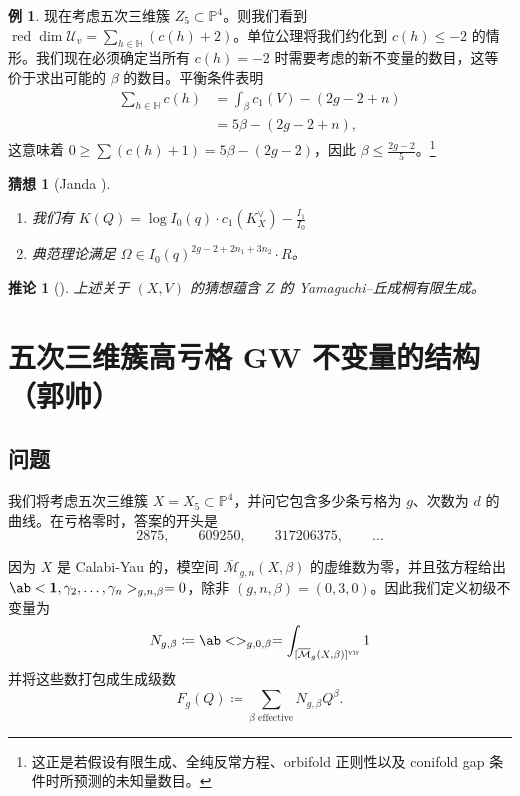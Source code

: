 \documentclass{amsart}
\newtheorem{cor}[thm]{推论}
\newtheorem{conj}[thm]{猜想}
\theoremstyle{definition}
\newtheorem{exm}[thm]{例}
\theoremstyle{remark}
\theoremstyle{plain}
\theoremstyle{definition}
\theoremstyle{remark}
\renewcommand{\H}{\mathbb{H}}
\renewcommand{\P}{\mathbb{P}}
\newcommand{\Mbar}{\overline{\mathcal{M}}}
\newcommand{\mc}[1]{\mathcal{#1}}
\newcommand{\mr}[1]{\mathrm{#1}}
\newcommand{\on}[1]{\operatorname{#1}}
\newcommand{\1}{\mathbf{1}}
\newcommand{\2}{\mathbf{2}}
\newcommand{\3}{\mathbf{3}}
\newcommand{\vir}{\mr{vir}}
\begin{document}
\begin{exm}
    现在考虑五次三维簇 \(Z_5 \subset \P^4\)。则我们看到 \(\on{red}\dim \mc{U}_v = \sum_{h \in \H} (c(h)+2)\)。单位公理将我们约化到 \(c(h) \leq -2\) 的情形。我们现在必须确定当所有 \(c(h) = -2\) 时需要考虑的新不变量的数目，这等价于求出可能的 \(\beta\) 的数目。平衡条件表明
    \begin{align*}
        \sum_{h \in \H} c(h) &= \int_{\beta} c_1(V) - (2g-2+n) \\
        &= 5\beta - (2g-2+n),
    \end{align*}
    这意味着 \(0 \geq \sum (c(h)+1) = 5\beta - (2g-2)\)，因此 \(\beta \leq \frac{2g-2}{5}\)。\footnote{这正是若假设有限生成、全纯反常方程、orbifold 正则性以及 conifold gap 条件时所预测的未知量数目。}
\end{exm}

\begin{conj}[Janda {\cite[Conjecture~1.6]{CJRtropical2025}}]\leavevmode
    \begin{enumerate}
        \item 我们有 \(K(Q) = \log I_0(q) \cdot c_1(K_X^{\vee}) - \frac{I_1}{I_0}\) \\
        \item 典范理论满足 \(\Omega \in I_0(q)^{2g-2+2n_1 + 3 n_2} \cdot R\)。
    \end{enumerate}
\end{conj}

\begin{cor}[{\cite[Theorem~1.7]{CJRtropical2025}}]
    上述关于 \((X, V)\) 的猜想蕴含 \(Z\) 的 Yamaguchi–丘成桐有限生成。
\end{cor}
\section{五次三维簇高亏格 GW 不变量的结构（郭帅）}%
\label{sec:Structure of higher-genus GW invariants of the quintic (Shuai Guo)}

\subsection{问题}%
\label{sub:The problem (Guo)}

我们将考虑五次三维簇 \(X = X_5 \subset \P^4\)，并问它包含多少条亏格为 \(g\)、次数为 \(d\) 的曲线。在亏格零时，答案的开头是
\[ 2875, \qquad 609250, \qquad 317206375, \qquad \ldots \]

因为 \(X\) 是 Calabi-Yau 的，模空间 \(\Mbar_{g,n}(X,\beta)\) 的虚维数为零，并且弦方程给出 \(\ab<\1, \gamma_2, \ldots, \gamma_n>_{g,n,\beta} = 0\)，除非 \((g,n,\beta) = (0,3,0)\)。因此我们定义初级不变量为
\[ N_{g,\beta} \coloneqq \ab<>_{g,0,\beta} = \int_{[\Mbar_g(X,\beta)]^{\vir}} 1 \]
并将这些数打包成生成级数
\[ F_g(Q) \coloneqq \sum_{\beta \text{ effective}} N_{g,\beta}Q^{\beta}. \]
\end{document}
